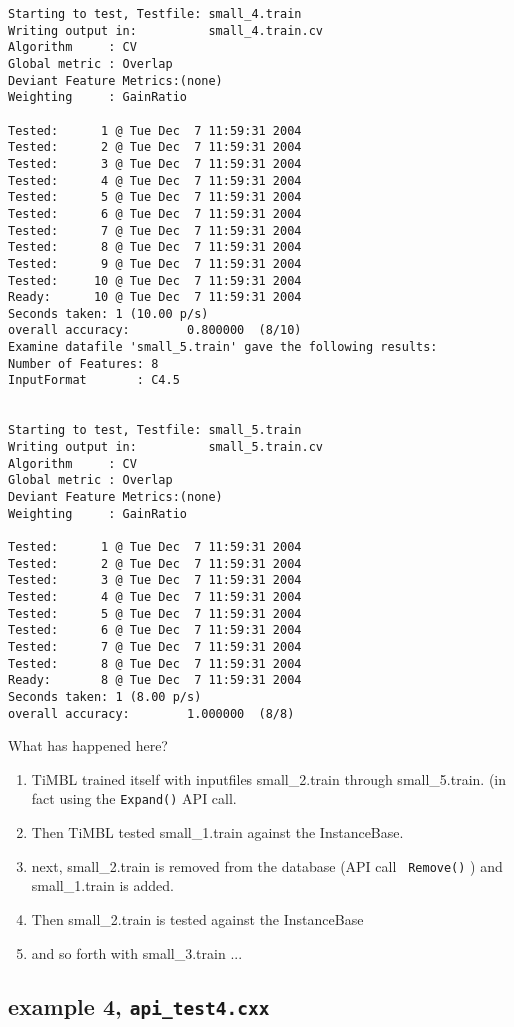 \begin{footnotesize}
\begin{verbatim}
Starting to test, Testfile: small_4.train
Writing output in:          small_4.train.cv
Algorithm     : CV
Global metric : Overlap
Deviant Feature Metrics:(none)
Weighting     : GainRatio

Tested:      1 @ Tue Dec  7 11:59:31 2004
Tested:      2 @ Tue Dec  7 11:59:31 2004
Tested:      3 @ Tue Dec  7 11:59:31 2004
Tested:      4 @ Tue Dec  7 11:59:31 2004
Tested:      5 @ Tue Dec  7 11:59:31 2004
Tested:      6 @ Tue Dec  7 11:59:31 2004
Tested:      7 @ Tue Dec  7 11:59:31 2004
Tested:      8 @ Tue Dec  7 11:59:31 2004
Tested:      9 @ Tue Dec  7 11:59:31 2004
Tested:     10 @ Tue Dec  7 11:59:31 2004
Ready:      10 @ Tue Dec  7 11:59:31 2004
Seconds taken: 1 (10.00 p/s)
overall accuracy:        0.800000  (8/10)
Examine datafile 'small_5.train' gave the following results:
Number of Features: 8
InputFormat       : C4.5


Starting to test, Testfile: small_5.train
Writing output in:          small_5.train.cv
Algorithm     : CV
Global metric : Overlap
Deviant Feature Metrics:(none)
Weighting     : GainRatio

Tested:      1 @ Tue Dec  7 11:59:31 2004
Tested:      2 @ Tue Dec  7 11:59:31 2004
Tested:      3 @ Tue Dec  7 11:59:31 2004
Tested:      4 @ Tue Dec  7 11:59:31 2004
Tested:      5 @ Tue Dec  7 11:59:31 2004
Tested:      6 @ Tue Dec  7 11:59:31 2004
Tested:      7 @ Tue Dec  7 11:59:31 2004
Tested:      8 @ Tue Dec  7 11:59:31 2004
Ready:       8 @ Tue Dec  7 11:59:31 2004
Seconds taken: 1 (8.00 p/s)
overall accuracy:        1.000000  (8/8)
\end{verbatim}
\end{footnotesize}


What has happened here?

\begin{enumerate}
\item TiMBL trained itself with inputfiles small\_2.train through
small\_5.train. (in fact using the {\tt Expand()} API call.
\item Then TiMBL tested small\_1.train against the InstanceBase.
\item next, small\_2.train is removed from the database (API call {\tt
Remove()} ) and small\_1.train is added.
\item Then small\_2.train is tested against the InstanceBase
\item and so forth with small\_3.train ...
\end{enumerate}

\subsection{example 4, {\tt api\_test4.cxx}}

